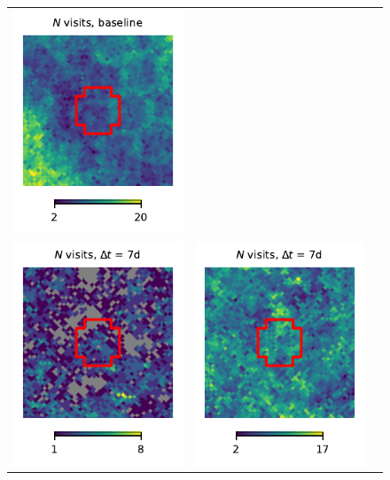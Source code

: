 \documentclass[preprintm,linenumbers]{aastex631}
\begin{document}
\begin{figure}
\begin{tabular}{  c c c}
				\includegraphics{results/skymaps_cutout/skymaps_cutout_first_year_one_snap_v4_0_10yrs_db_noDD_noTwi_nside-256_CountMetric_r_GP_noDD_noTwi.pdf} \\
				\includegraphics{results/skymaps_cutout/skymaps_cutout_first_year_one_snap_v4_0_10yrs_db_noDD_noTwi_tscale-7_nside-256_doAllTemplateMetrics_reduceCount_r_NES_noDD_noTwi.pdf} &
				\includegraphics{results/skymaps_cutout/skymaps_cutout_first_year_one_snap_v4_0_10yrs_db_noDD_noTwi_tscale-7_nside-256_doAllTemplateMetrics_reduceCount_r_WFD_noDD_noTwi.pdf} &

\end{tabular}
\end{figure}
\end{document}
